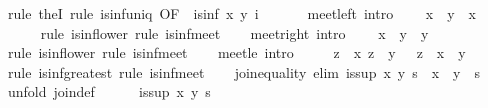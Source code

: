 \begin{isabellebody}
\ {\isacharparenleft}rule\ theI{\isacharparenright}\ {\isacharparenleft}rule\ is{\isacharunderscore}inf{\isacharunderscore}uniq\ {\isacharbrackleft}OF\ {\isacharunderscore}\ {\isacharbackquoteopen}is{\isacharunderscore}inf\ x\ y\ i{\isacharbackquoteclose}{\isacharbrackright}{\isacharparenright}\isanewline
\ \ \isamarkupfalse%
\isanewline
\isanewline
\ \ \isamarkupfalse%
\ meet{\isacharunderscore}left\ {\isacharbrackleft}intro{\isacharquery}{\isacharbrackright}{\isacharcolon}\isanewline
\ \ \ \ {\isachardoublequoteopen}x\ {\isasymsqinter}\ y\ {\isasymsqsubseteq}\ x{\isachardoublequoteclose}\isanewline
\ \ \ \ \isamarkupfalse%
\ {\isacharparenleft}rule\ is{\isacharunderscore}inf{\isacharunderscore}lower{\isacharparenright}\ {\isacharparenleft}rule\ is{\isacharunderscore}inf{\isacharunderscore}meet{\isacharparenright}\isanewline
\isanewline
\ \ \isamarkupfalse%
\ meet{\isacharunderscore}right\ {\isacharbrackleft}intro{\isacharquery}{\isacharbrackright}{\isacharcolon}\isanewline
\ \ \ \ {\isachardoublequoteopen}x\ {\isasymsqinter}\ y\ {\isasymsqsubseteq}\ y{\isachardoublequoteclose}\isanewline
\ \ \ \ \isamarkupfalse%
\ {\isacharparenleft}rule\ is{\isacharunderscore}inf{\isacharunderscore}lower{\isacharparenright}\ {\isacharparenleft}rule\ is{\isacharunderscore}inf{\isacharunderscore}meet{\isacharparenright}\isanewline
\isanewline
\ \ \isamarkupfalse%
\ meet{\isacharunderscore}le\ {\isacharbrackleft}intro{\isacharquery}{\isacharbrackright}{\isacharcolon}\isanewline
\ \ \ \ {\isachardoublequoteopen}{\isasymlbrakk}\ z\ {\isasymsqsubseteq}\ x{\isacharsemicolon}\ z\ {\isasymsqsubseteq}\ y\ {\isasymrbrakk}\ {\isasymLongrightarrow}\ z\ {\isasymsqsubseteq}\ x\ {\isasymsqinter}\ y{\isachardoublequoteclose}\isanewline
\ \ \ \ \isamarkupfalse%
\ {\isacharparenleft}rule\ is{\isacharunderscore}inf{\isacharunderscore}greatest{\isacharparenright}\ {\isacharparenleft}rule\ is{\isacharunderscore}inf{\isacharunderscore}meet{\isacharparenright}\isanewline
\isanewline
\ \ \isamarkupfalse%
\ join{\isacharunderscore}equality\ {\isacharbrackleft}elim{\isacharquery}{\isacharbrackright}{\isacharcolon}\ {\isachardoublequoteopen}is{\isacharunderscore}sup\ x\ y\ s\ {\isasymLongrightarrow}\ x\ {\isasymsqunion}\ y\ {\isacharequal}\ s{\isachardoublequoteclose}\isanewline
\ \ \isamarkupfalse%
\ {\isacharparenleft}unfold\ join{\isacharunderscore}def{\isacharparenright}\isanewline
\ \ \ \ \isamarkupfalse%
\ {\isachardoublequoteopen}is{\isacharunderscore}sup\ x\ y\ s{\isachardoublequoteclose}\isanewline

\end{isabellebody}
